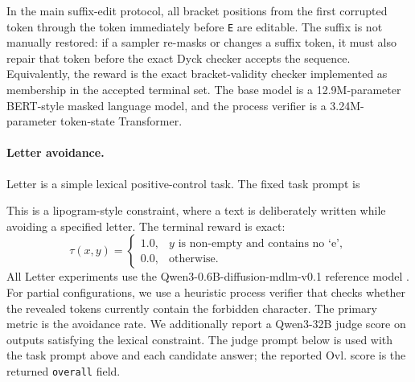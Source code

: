 \documentclass{article}
\numberwithin{theorem}{section}
\numberwithin{proposition}{section}
\numberwithin{corollary}{section}
\numberwithin{lemma}{section}
\numberwithin{conjecture}{section}
\numberwithin{remark}{section}
\numberwithin{definition}{section}
\numberwithin{assumption}{section}
\numberwithin{example}{section}
\begin{document}
In the main suffix-edit protocol, all bracket positions from the first corrupted token through the token immediately before \texttt{E} are editable. The suffix is not manually restored: if a sampler re-masks or changes a suffix token, it must also repair that token before the exact Dyck checker accepts the sequence. Equivalently, the reward is the exact bracket-validity checker implemented as membership in the accepted terminal set. The base model is a 12.9M-parameter BERT-style masked language model, and the process verifier is a 3.24M-parameter token-state Transformer.

\paragraph{Letter avoidance.}
Letter is a simple lexical positive-control task. The fixed task prompt is
\begin{center}
\end{center}
This is a lipogram-style constraint, where a text is deliberately written while avoiding a specified letter. The terminal reward is exact:
\begin{equation*}
    \tau(x,y)
    =
    \begin{cases}
        1.0, & y\text{ is non-empty and contains no `e'},\\
        0.0, & \text{otherwise}.
    \end{cases}
\end{equation*}
All Letter experiments use the Qwen3-0.6B-diffusion-mdlm-v0.1 reference model \citep{qwen3_06b_diffusion_mdlm}. For partial configurations, we use a heuristic process verifier that checks whether the revealed tokens currently contain the forbidden character. The primary metric is the avoidance rate. We additionally report a Qwen3-32B \citep{qwen2025qwen3} judge score on outputs satisfying the lexical constraint. The judge prompt below is used with the task prompt above and each candidate answer; the reported Ovl. score is the returned \texttt{overall} field.
\end{document}
